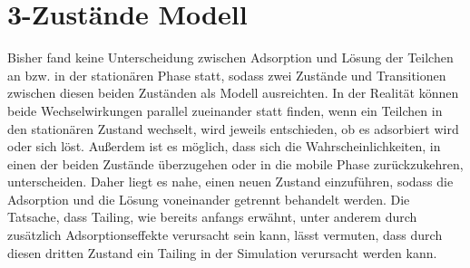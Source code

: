 \section{3-Zustände Modell} 
\label{chapter:mod:3s}


Bisher fand keine Unterscheidung zwischen Adsorption und Lösung der Teilchen an bzw. in der stationären Phase statt, sodass zwei Zustände und Transitionen zwischen diesen beiden Zuständen als Modell ausreichten. In der Realität können beide Wechselwirkungen parallel zueinander statt finden, wenn ein Teilchen in den stationären Zustand wechselt, wird jeweils entschieden, ob es adsorbiert wird oder sich löst.
Außerdem ist es möglich, dass sich die Wahrscheinlichkeiten, in einen der beiden Zustände überzugehen oder in die mobile Phase zurückzukehren, unterscheiden. Daher liegt es nahe, einen neuen Zustand einzuführen, sodass die Adsorption und die Lösung voneinander getrennt behandelt werden. Die Tatsache, dass Tailing, wie bereits anfangs erwähnt, unter anderem durch zusätzlich Adsorptionseffekte verursacht sein kann, lässt vermuten, dass durch diesen dritten Zustand ein Tailing in der Simulation verursacht werden kann. 
 
